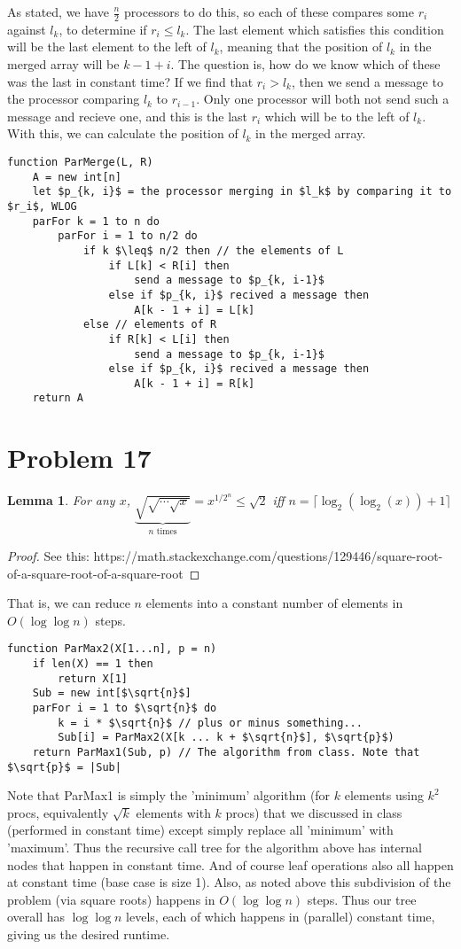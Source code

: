 \documentclass{article}
\newtheorem{lemma}{Lemma}
\providecommand{\prob}[1]{\section*{Problem #1}}
\begin{document}
As stated, we have $\frac{n}{2}$ processors to do this, so each of these compares some $r_i$ against $l_k$, to determine if $r_i \leq l_k$.
The last element which satisfies this condition will be the last element to the left of $l_k$, meaning that the position of $l_k$ in the merged array will be $k - 1 + i$.
The question is, how do we know which of these was the last in constant time?
If we find that $r_i > l_k$, then we send a message to the processor comparing $l_k$ to $r_{i-1}$.
Only one processor will both not send such a message and recieve one, and this is the last $r_i$ which will be to the left of $l_k$.
With this, we can calculate the position of $l_k$ in the merged array.

\begin{lstlisting}
function ParMerge(L, R)
    A = new int[n]
    let $p_{k, i}$ = the processor merging in $l_k$ by comparing it to $r_i$, WLOG
    parFor k = 1 to n do
        parFor i = 1 to n/2 do
            if k $\leq$ n/2 then // the elements of L
                if L[k] < R[i] then
                    send a message to $p_{k, i-1}$
                else if $p_{k, i}$ recived a message then
                    A[k - 1 + i] = L[k]
            else // elements of R
                if R[k] < L[i] then
                    send a message to $p_{k, i-1}$
                else if $p_{k, i}$ recived a message then
                    A[k - 1 + i] = R[k]
    return A
\end{lstlisting}


\prob{17}
\begin{lemma}
    For any $x$, $\underbrace{\sqrt{\sqrt{\cdots\sqrt{x}}}}_{n\text{ times}}=x^{1/2^n}\leq \sqrt{2}$ iff $n = \lceil\log_2(\log_2(x))+1\rceil$
\end{lemma}
\begin{proof}
    See this: https://math.stackexchange.com/questions/129446/square-root-of-a-square-root-of-a-square-root
\end{proof}

That is, we can reduce $n$ elements into a constant number of elements in $O(\log \log n)$ steps.

\begin{lstlisting}
function ParMax2(X[1...n], p = n)
    if len(X) == 1 then
        return X[1]
    Sub = new int[$\sqrt{n}$]
    parFor i = 1 to $\sqrt{n}$ do
        k = i * $\sqrt{n}$ // plus or minus something...
        Sub[i] = ParMax2(X[k ... k + $\sqrt{n}$], $\sqrt{p}$)
    return ParMax1(Sub, p) // The algorithm from class. Note that $\sqrt{p}$ = |Sub|
\end{lstlisting}

Note that ParMax1 is simply the 'minimum' algorithm (for $k$ elements using $k^2$ procs, equivalently $\sqrt{k}$ elements with $k$ procs) that we discussed in class (performed in constant time) except simply replace all 'minimum' with 'maximum'. Thus the recursive call tree for the algorithm above has internal nodes that happen in constant time. And of course leaf operations also all happen at constant time (base case is size 1). Also, as noted above this subdivision of the problem (via square roots) happens in $O(\log \log n)$ steps. Thus our tree overall has $\log \log n$ levels, each of which happens in (parallel) constant time, giving us the desired runtime. 
\end{document}
